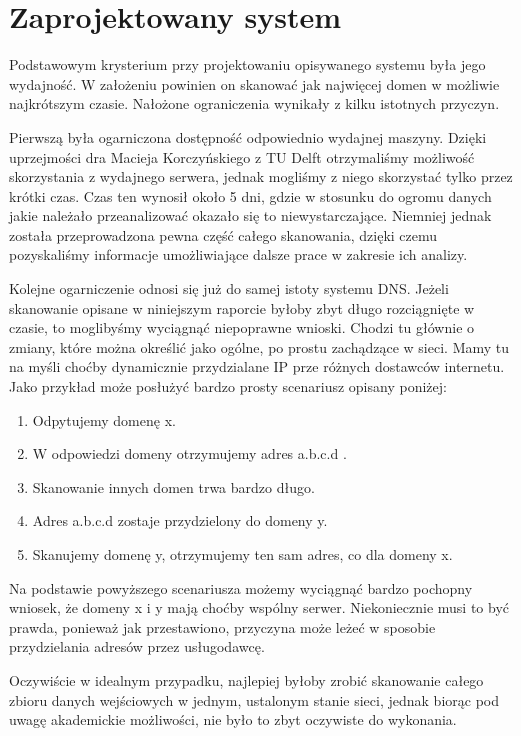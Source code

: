\section{Zaprojektowany system}

Podstawowym krysterium przy projektowaniu opisywanego systemu była jego wydajność. W założeniu powinien on skanować jak najwięcej domen w możliwie najkrótszym czasie. Nałożone ograniczenia wynikały z kilku istotnych przyczyn. 

Pierwszą była ogarniczona dostępność odpowiednio wydajnej maszyny. Dzięki uprzejmości dra Macieja Korczyńskiego z TU Delft otrzymaliśmy możliwość skorzystania z wydajnego serwera, jednak mogliśmy z niego skorzystać tylko przez krótki czas. Czas ten wynosił około 5 dni, gdzie w stosunku do ogromu danych jakie należało przeanalizować okazało się to niewystarczające. Niemniej jednak została przeprowadzona pewna część całego skanowania, dzięki czemu pozyskaliśmy informacje umożliwiające dalsze prace w zakresie ich analizy. 

Kolejne ogarniczenie odnosi się już do samej istoty systemu DNS. Jeżeli skanowanie opisane w niniejszym raporcie byłoby zbyt długo rozciągnięte w czasie, to moglibyśmy wyciągnąć niepoprawne wnioski. Chodzi tu głównie o zmiany, które można określić jako ogólne, po prostu zachądzące w sieci. Mamy tu na myśli choćby dynamicznie przydzialane IP prze różnych dostawców internetu. Jako przykład może posłużyć bardzo prosty scenariusz opisany poniżej:
\begin{enumerate}
    \item Odpytujemy domenę x.
    \item W odpowiedzi domeny otrzymujemy adres a.b.c.d .
    \item Skanowanie innych domen trwa bardzo długo.
    \item Adres a.b.c.d zostaje przydzielony do domeny y.
    \item Skanujemy domenę y, otrzymujemy ten sam adres, co dla domeny x.
\end{enumerate}
Na podstawie powyższego scenariusza możemy wyciągnąć bardzo pochopny wniosek, że domeny x i y mają choćby wspólny serwer. Niekoniecznie musi to być prawda, ponieważ jak przestawiono, przyczyna może leżeć w sposobie przydzielania adresów przez usługodawcę. 

Oczywiście w idealnym przypadku, najlepiej byłoby zrobić skanowanie całego zbioru danych wejściowych w jednym, ustalonym stanie sieci, jednak biorąc pod uwagę akademickie możliwości, nie było to zbyt oczywiste do wykonania.

